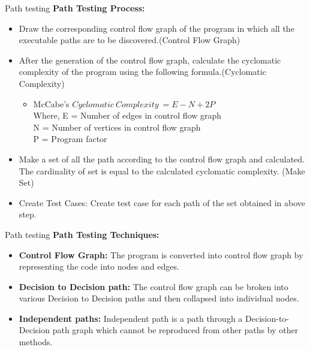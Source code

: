 \documentclass{beamer}
\begin{document}
\begin{frame}{Path testing}
	\textbf{Path Testing Process:}
	\begin{itemize}
		\item Draw the corresponding control flow graph of the program in which all the executable paths are to be discovered.(Control Flow Graph)
		\item After the generation of the control flow graph, calculate the cyclomatic 
		complexity of the program using the following formula.(Cyclomatic Complexity)
		\begin{itemize}
			\item McCabe's $Cyclomatic \  Complexity\  = E - N + 2P$\\
			Where, E = Number of edges in control flow graph\\ N = Number of vertices in control flow graph\\ P =
			Program factor
		\end{itemize}
	\item Make a set of all the path according to the control flow graph and calculated. The cardinality 
	of set is equal to the calculated cyclomatic complexity.
(Make Set)
	\item Create Test Cases: Create test case for each path of the set obtained in above step.
	\end{itemize}
\end{frame}
\begin{frame}{Path testing}
	\textbf{Path Testing Techniques:}
	\begin{itemize}
		\item \textbf{Control Flow Graph:} The program is converted into control flow graph by representing the code into 
		nodes and edges.
		\item \textbf{Decision to Decision path:} The control flow graph can be broken into various Decision to Decision paths 
		and then collapsed into individual nodes.
		\item \textbf{Independent paths:} Independent path is a path through a Decision-to-Decision path graph which 
		cannot be reproduced from other paths by other methods.
		
	\end{itemize}
\end{frame}
\end{document}
